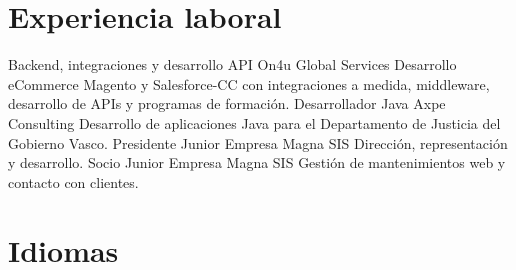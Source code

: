 \documentclass[letterpaper]{twentysecondcv} %
\begin{document}

\section{Experiencia laboral}

\begin{twenty} %
	    {Backend, integraciones y desarrollo API}
    	{On4u Global Services}
    	{Desarrollo eCommerce Magento y Salesforce-CC con integraciones a medida, middleware, desarrollo de APIs y programas de formación.}
	    {Desarrollador Java}
    	{Axpe Consulting}
    	{Desarrollo de aplicaciones Java para el Departamento de Justicia del Gobierno Vasco.}
	    {Presidente}
    	{Junior Empresa Magna SIS}
    	{Dirección, representación y desarrollo.}
	    {Socio}
    	{Junior Empresa Magna SIS} 
    	{Gestión de mantenimientos web y contacto con clientes.}
\end{twenty}


\section{Idiomas}

\begin{twentyshort} %
\end{twentyshort}
\end{document}
